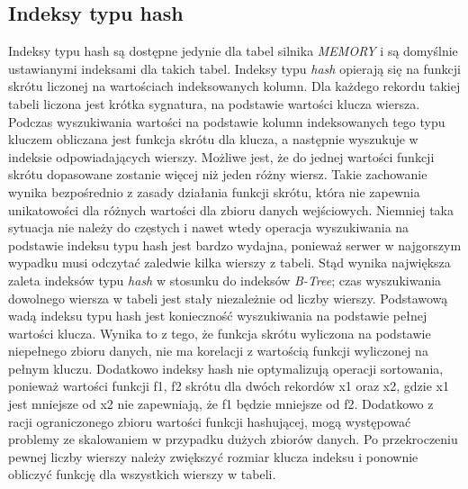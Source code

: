 
\subsection{Indeksy typu hash}
Indeksy typu hash są dostępne jedynie dla tabel silnika \textit{MEMORY} i są domyślnie ustawianymi indeksami dla takich tabel. Indeksy typu \textit{hash} opierają się na funkcji skrótu liczonej na wartościach indeksowanych kolumn. Dla każdego rekordu takiej tabeli liczona jest krótka sygnatura, na podstawie wartości klucza wiersza. Podczas wyszukiwania wartości na podstawie kolumn indeksowanych tego typu kluczem obliczana jest funkcja skrótu dla klucza, a następnie wyszukuje w indeksie odpowiadających wierszy. Możliwe jest, że do jednej wartości funkcji skrótu dopasowane zostanie więcej niż jeden różny wiersz. Takie zachowanie wynika bezpośrednio z zasady działania funkcji skrótu, która nie zapewnia unikatowości dla różnych wartości dla zbioru danych wejściowych. Niemniej taka sytuacja nie należy do częstych i nawet wtedy operacja wyszukiwania na podstawie indeksu typu hash jest bardzo wydajna, ponieważ serwer w najgorszym wypadku musi odczytać zaledwie kilka wierszy z tabeli. Stąd wynika największa zaleta indeksów typu \textit{hash} w stosunku do indeksów \textit{B-Tree}; czas wyszukiwania dowolnego wiersza w tabeli jest stały niezależnie od liczby wierszy. Podstawową wadą indeksu typu hash jest konieczność wyszukiwania na podstawie pełnej wartości klucza. Wynika to z tego, że funkcja skrótu wyliczona na podstawie niepełnego zbioru danych, nie ma korelacji z wartością funkcji wyliczonej na pełnym kluczu. Dodatkowo indeksy hash nie optymalizują operacji sortowania, ponieważ wartości funkcji f1, f2 skrótu dla dwóch rekordów x1 oraz x2, gdzie x1 jest mniejsze od x2 nie zapewniają, że f1 będzie mniejsze od f2. Dodatkowo z racji ograniczonego zbioru wartości funkcji hashującej, mogą występować problemy ze skalowaniem w przypadku dużych zbiorów danych. Po przekroczeniu pewnej liczby wierszy należy zwiększyć rozmiar klucza indeksu i ponownie obliczyć funkcję dla wszystkich wierszy w tabeli.
